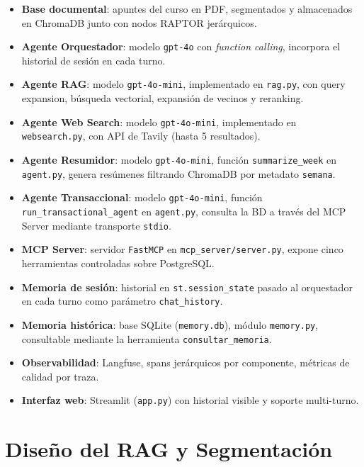 \documentclass[conference]{IEEEtran}
\begin{document}
\begin{itemize}
    \item \textbf{Base documental}: apuntes del curso en PDF, segmentados y almacenados en ChromaDB junto con nodos RAPTOR jerárquicos.
    \item \textbf{Agente Orquestador}: modelo \texttt{gpt-4o} con \textit{function calling}, incorpora el historial de sesión en cada turno.
    \item \textbf{Agente RAG}: modelo \texttt{gpt-4o-mini}, implementado en \texttt{rag.py}, con query expansion, búsqueda vectorial, expansión de vecinos y reranking.
    \item \textbf{Agente Web Search}: modelo \texttt{gpt-4o-mini}, implementado en \texttt{websearch.py}, con API de Tavily (hasta 5 resultados).
    \item \textbf{Agente Resumidor}: modelo \texttt{gpt-4o-mini}, función \texttt{summarize\_week} en \texttt{agent.py}, genera resúmenes filtrando ChromaDB por metadato \texttt{semana}.
    \item \textbf{Agente Transaccional}: modelo \texttt{gpt-4o-mini}, función \texttt{run\_transactional\_agent} en \texttt{agent.py}, consulta la BD a través del MCP Server mediante transporte \texttt{stdio}.
    \item \textbf{MCP Server}: servidor \texttt{FastMCP} en \texttt{mcp\_server/server.py}, expone cinco herramientas controladas sobre PostgreSQL.
    \item \textbf{Memoria de sesión}: historial en \texttt{st.session\_state} pasado al orquestador en cada turno como parámetro \texttt{chat\_history}.
    \item \textbf{Memoria histórica}: base SQLite (\texttt{memory.db}), módulo \texttt{memory.py}, consultable mediante la herramienta \texttt{consultar\_memoria}.
    \item \textbf{Observabilidad}: Langfuse, spans jerárquicos por componente, métricas de calidad por traza.
    \item \textbf{Interfaz web}: Streamlit (\texttt{app.py}) con historial visible y soporte multi-turno.
\end{itemize}

\section{Diseño del RAG y Segmentación}
\end{document}
